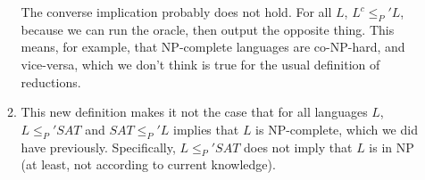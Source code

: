\documentclass{article}
\begin{document}
\begin{enumerate}
\begin{enumerate}
        The converse implication probably does not hold. For all $L$, $L^c \leq_P' L$, because we can run the oracle, then output the opposite thing. This means, for example, that $\textrm{NP}$-complete languages are $\textrm{co-NP}$-hard, and vice-versa, which we don't think is true for the usual definition of reductions.
      \item This new definition makes it not the case that for all languages $L$, $L \leq_P' \mathit{SAT}$ and $\mathit{SAT} \leq_P' L$ implies that $L$ is $\textrm{NP}$-complete, which we did have previously. Specifically, $L \leq_P' \mathit{SAT}$ does not imply that $L$ is in $\textrm{NP}$ (at least, not according to current knowledge).
    \end{enumerate}
\end{enumerate}
\end{document}
